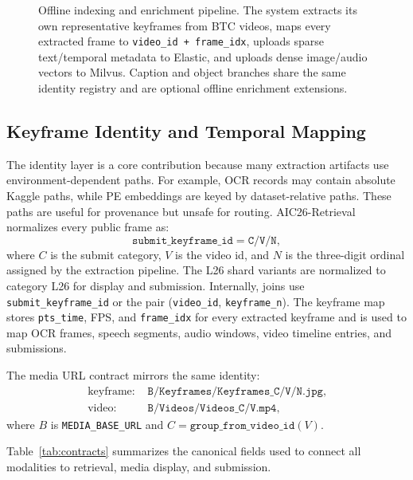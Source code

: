 \documentclass[conference]{IEEEtran}
\newcommand{\sys}{AIC26-Retrieval}
\newcommand{\sid}{\texttt{submit\_keyframe\_id}}
\newcommand{\vid}{\texttt{video\_id}}
\newcommand{\fid}{\texttt{frame\_idx}}
\newcommand{\kfn}{\texttt{keyframe\_n}}
\newcommand{\ptstime}{\texttt{pts\_time}}
\newcommand{\submitpair}{\texttt{video\_id + frame\_idx}}
\begin{document}
\begin{figure}[t]
{
}
\caption{Offline indexing and enrichment pipeline. The system extracts its own
representative keyframes from BTC videos, maps every extracted frame to
\submitpair{}, uploads sparse text/temporal metadata to Elastic, and uploads
dense image/audio vectors to Milvus. Caption and object branches share the same
identity registry and are optional offline enrichment extensions.}
\label{fig:offline-indexing}
\end{figure}

\subsection{Keyframe Identity and Temporal Mapping}

The identity layer is a core contribution because many extraction artifacts use
environment-dependent paths. For example, OCR records may contain absolute
Kaggle paths, while PE embeddings are keyed by dataset-relative paths. These
paths are useful for provenance but unsafe for routing. \sys{} normalizes every
public frame as:
\[
  \sid = \texttt{C/V/N},
\]
where $C$ is the submit category, $V$ is the video id, and $N$ is the three-digit
ordinal assigned by the extraction pipeline. The L26 shard variants are normalized to category L26 for
display and submission. Internally, joins use \sid{} or the pair
(\vid{}, \kfn{}). The keyframe map stores \ptstime{}, FPS, and \fid{} for every
extracted keyframe and is used to map OCR frames, speech segments, audio windows, video
timeline entries, and submissions.

The media URL contract mirrors the same identity:
\[
\begin{split}
\text{keyframe: }&\texttt{B/Keyframes/Keyframes\_C/V/N.jpg},\\
\text{video: }&\texttt{B/Videos/Videos\_C/V.mp4},
\end{split}
\]
where $B$ is \texttt{MEDIA\_BASE\_URL} and $C=\texttt{group\_from\_video\_id}(V)$.

Table~\ref{tab:contracts} summarizes the canonical fields used to connect all
modalities to retrieval, media display, and submission.
\end{document}
